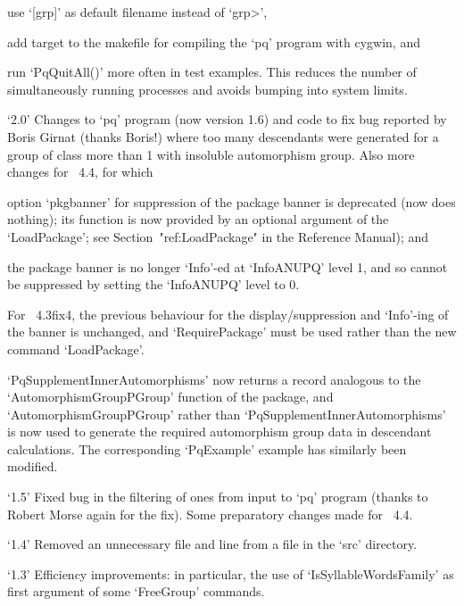 \itemitem{--}%
use `[grp]' as default filename instead of `\<grp>',

\itemitem{--}
add target to the makefile for compiling the `pq'  program  with  cygwin,
and

\itemitem{--} 
run `PqQuitAll()' more often in test examples. This reduces the number of
simultaneously running processes and avoids bumping into system limits.

\item{`2.0'}
Changes to `pq' program (now version 1.6) and  {\GAP}  code  to  fix  bug
reported by Boris Girnat (thanks Boris!) where too many descendants  were
generated for a group of class more than 1  with  insoluble  automorphism
group. Also more changes for {\GAP}~4.4, for which

\itemitem{--}%
option `pkgbanner' for suppression of the package  banner  is  deprecated
(now does nothing); its function is now provided by an optional  argument
of  the  `LoadPackage';  see  Section~"ref:LoadPackage"  in  the   {\GAP}
Reference Manual); and

\itemitem{--}
the package banner is no longer `Info'-ed at `InfoANUPQ' level 1, and  so
cannot be suppressed by setting the `InfoANUPQ' level to 0.

\item{}
For {\GAP}~4.3fix4, the previous behaviour  for  the  display/suppression
and `Info'-ing of the banner is unchanged, and `RequirePackage'  must  be
used rather than the new command `LoadPackage'.

\item{}
`PqSupplementInnerAutomorphisms' now returns a record  analogous  to  the
`AutomorphismGroupPGroup'  function  of  the  {\AutPGrp}   package,   and
`AutomorphismGroupPGroup' rather than `PqSupplementInnerAutomorphisms' is
now used to generate the required automorphism group data  in  descendant
calculations. The corresponding `PqExample' example  has  similarly  been
modified.

\item{`1.5'}
Fixed bug in the filtering of ones from input to `pq' program (thanks  to
Robert Morse again for  the  fix).  Some  preparatory  changes  made  for
{\GAP}~4.4.

\item{`1.4'}
Removed an unnecessary file and line from a file in the `src' directory.

\item{`1.3'}
Efficiency improvements: in particular, the use of `IsSyllableWordsFamily'
as first argument of some `FreeGroup' commands.

